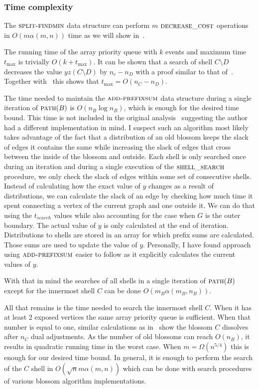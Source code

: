 \subsubsection*{Time complexity} 

The $\textsc{split-findmin}$ data structure can perform $m$ $\textsc{decrease\_cost}$ operations in $O(m\alpha(m,n))$ time as we will show in~.

The running time of the array priority queue with $k$ events and maximum time $t_{\max}$ is trivially $O(k + t_{\max})$. It can be shown that a search of shell $C \setminus D$ decreases the value $yz(C \setminus D)$ by $n_c - n_D$ with a proof similar to that of~. Together with~ this shows that $t_{\max} = O(n_C - n_D)$. 

The time needed to maintain the $\textsc{add-prefixsum}$ data structure during a single iteration of $\textsc{path}(B)$ is $O(n_B \log n_B)$, which is enough for the desired time bound. This time is not included in the original analysis~\cite{gabow1984scaling} suggesting the author had a different implementation in mind. I suspect such an algorithm most likely takes advantage of the fact that a distribution of an old blossom keeps the slack of edges it contains the same while increasing the slack of edges that cross between the inside of the blossom and outside. Each shell is only searched once during an iteration and during a single execution of the $\textsc{shell\_search}$ procedure, we only check the slack of edges within some set of consecutive shells. Instead of calculating how the exact value of $y$ changes as a result of distributions, we can calculate the slack of an edge by checking how much time it spent connecting a vertex of the current graph and one outside it. We can do that using the $t_{search}$ values while also accounting for the case when $G$ is the outer boundary. The actual value of $y$ is only calculated at the end of iteration. Distributions to shells are stored in an array for which prefix sums are calculated. Those sums are used to update the value of $y$. Personally, I have found approach using $\textsc{add-prefixsum}$ easier to follow as it explicitly calculates the current values of $y$.

With that in mind the searches of all shells in a single iteration of $\textsc{path}(B)$ except for the innermost shell $C$ can be done $O(m_B \alpha(m_B, n_B))$. 

All that remains is the time needed to search the innermost shell $C$. When it has at least 2 exposed vertices the same array priority queue is sufficient. When that number is equal to one, similar calculations as in~ show the blossom $C$ dissolves after $n_C$ dual adjustments. As the number of old blossoms can reach $O(n_B)$, it results in quadratic running time in the worst case. When $m = \Omega(n^{5/4})$ this is enough for our desired time bound. In general, it is enough to perform the search of the $C$ shell in $O(\sqrt{n}m \alpha(m,n))$ which can be done with search procedures of various blossom algorithm implementations.

